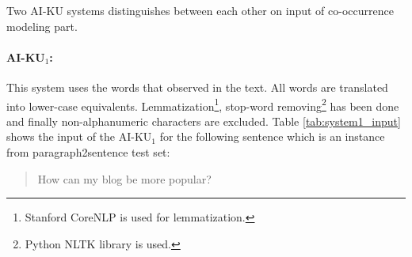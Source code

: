\documentclass[11pt]{article}
\begin{document}
\begin{table}[t]
\begin{center}


\end{center}
\caption{\label{table:results-s2p} Sentence2phrase subtask scores for the test set. \emph{Best} indicates the best score for the subtasks. LCS stands for Normalized Longest Common Substring. Subscripts in AI-KU systems indicate the run number.}
\end{table}

Two AI-KU systems distinguishes between each other on input of co-occurrence modeling part. 

\paragraph{AI-KU$_1$:} This system uses the words that observed in the text. All words are translated into lower-case equivalents. Lemmatization\footnote{Stanford CoreNLP is used for lemmatization.}, stop-word removing\footnote{Python NLTK library is used.} has been done and finally non-alphanumeric characters are excluded. Table \ref{tab:system1_input} shows the input of the AI-KU$_1$ for the following sentence which is an instance from paragraph2sentence test set:

\begin{quote}
How can my blog be more popular?
\end{quote}
\end{document}
